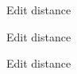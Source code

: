 


\begin{frame}{Edit distance}
\end{frame}


\begin{frame}{Edit distance}
\end{frame}


\begin{frame}{Edit distance}
\end{frame}

%      
